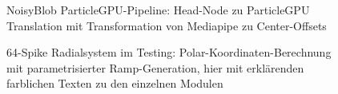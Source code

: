 \begin{figure}[htbp]
    \centering
    \caption{NoisyBlob ParticleGPU-Pipeline: Head-Node zu ParticleGPU Translation mit Transformation von Mediapipe zu Center-Offsets}
    \label{fig:particle_translation}
\end{figure}

\begin{figure}[htbp]
    \centering
    \caption{64-Spike Radialsystem im Testing: Polar-Koordinaten-Berechnung mit parametrisierter Ramp-Generation, hier mit erklärenden farblichen Texten zu den einzelnen Modulen}
    \label{fig:radial_spike_system}
\end{figure}

